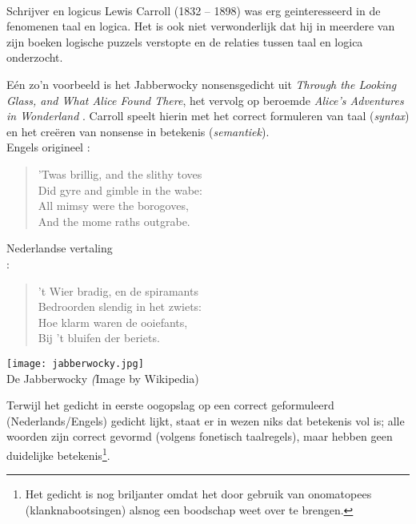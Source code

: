 \begin{aside}\mbox{}\\
Schrijver en logicus Lewis Carroll (1832 -- 1898) was erg geinteresseerd in de fenomenen taal en logica. Het is ook niet verwonderlijk dat hij in meerdere van zijn boeken logische puzzels verstopte en de relaties tussen taal en logica onderzocht.

E\'en zo'n voorbeeld is het Jabberwocky nonsensgedicht uit \textit{Through the Looking Glass, and What Alice Found There}, het vervolg op beroemde \textit{Alice's Adventures in Wonderland} \cite{carroll}. Carroll speelt hierin met het correct formuleren van taal (\emph{syntax}) en het cre\"eren van nonsense in betekenis (\emph{semantiek}). \\[2.5pt]

Engels origineel \cite{carroll}:
\begin{quote}
    'Twas brillig, and the slithy toves\\
    Did gyre and gimble in the wabe:\\
    All mimsy were the borogoves,\\
    And the mome raths outgrabe.
\end{quote}
Nederlandse vertaling\\ \cite{wauwelwok}:
\begin{quote}
    't Wier bradig, en de spiramants\\
	Bedroorden slendig in het zwiets:\\
	Hoe klarm waren de ooiefants,\\
	Bij 't bluifen der beriets.\\
\end{quote}

  \begin{marginfigure}
\texttt{[image: jabberwocky.jpg]}\\
   De Jabberwocky {\scriptsize\emph (Image by Wikipedia)}\\[3mm]
  \end{marginfigure}

Terwijl het gedicht in eerste oogopslag op een correct geformuleerd (Nederlands/Engels) gedicht lijkt, staat er in wezen niks dat betekenis vol is; alle woorden zijn correct gevormd (volgens fonetisch taalregels), maar hebben geen duidelijke betekenis\footnote{Het gedicht is nog briljanter omdat het door gebruik van onomatopees (klanknabootsingen) alsnog een boodschap weet over te brengen.}.
\end{aside}


